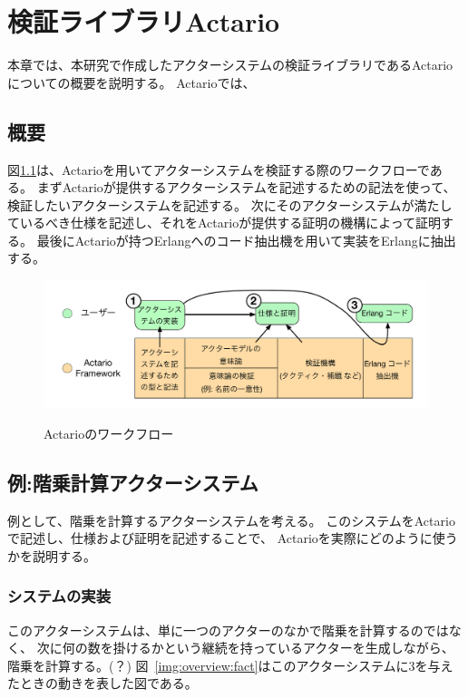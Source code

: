 \chapter{検証ライブラリActario}
\label{chapter:overview}

本章では、本研究で作成したアクターシステムの検証ライブラリであるActarioについての概要を説明する。
Actarioでは、

\section{概要}

図\ref{img:overview:workflow}は、Actarioを用いてアクターシステムを検証する際のワークフローである。
まずActarioが提供するアクターシステムを記述するための記法を使って、検証したいアクターシステムを記述する。
次にそのアクターシステムが満たしているべき仕様を記述し、それをActarioが提供する証明の機構によって証明する。
最後にActarioが持つErlangへのコード抽出機を用いて実装をErlangに抽出する。

\begin{figure}[tp]
  \includegraphics[width=14cm]{./img/overview/workflow.pdf}
  \label{img:overview:workflow}
  \caption{Actarioのワークフロー}
\end{figure}

\section{例:階乗計算アクターシステム}

例として、階乗を計算するアクターシステムを考える。
このシステムをActarioで記述し、仕様および証明を記述することで、
Actarioを実際にどのように使うかを説明する。

\subsection{システムの実装}

このアクターシステムは、単に一つのアクターのなかで階乗を計算するのではなく、
次に何の数を掛けるかという継続を持っているアクターを生成しながら、
階乗を計算する。(？)
図~\ref{img:overview:fact}はこのアクターシステムに$3$を与えたときの動きを表した図である。

